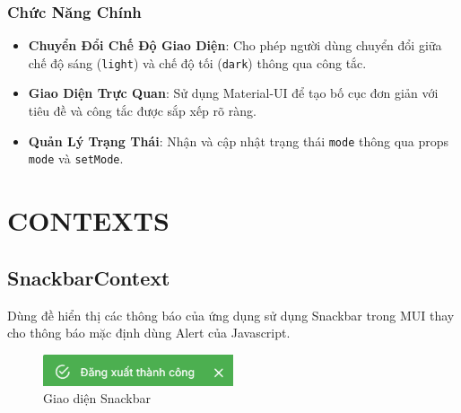             \subsubsection{Chức Năng Chính}
                \begin{itemize}
                    \item \textbf{Chuyển Đổi Chế Độ Giao Diện}: Cho phép người dùng chuyển đổi giữa chế độ sáng (\texttt{light}) và chế độ tối (\texttt{dark}) thông qua công tắc.
                    \item \textbf{Giao Diện Trực Quan}: Sử dụng Material-UI để tạo bố cục đơn giản với tiêu đề và công tắc được sắp xếp rõ ràng.
                    \item \textbf{Quản Lý Trạng Thái}: Nhận và cập nhật trạng thái \texttt{mode} thông qua props \texttt{mode} và \texttt{setMode}.
                \end{itemize}
    \section{CONTEXTS}
        \subsection{SnackbarContext}
            \hspace*{0.6cm}Dùng đề hiển thị các thông báo của ứng dụng sử dụng Snackbar trong MUI thay cho thông báo mặc định dùng Alert của Javascript.
            \begin{figure}[H]
                \centering
                \includegraphics[width=0.5\textwidth]{pictures/Snackbar.png}
                \caption{Giao diện Snackbar}
                \label{fig:snackbar}
            \end{figure}

